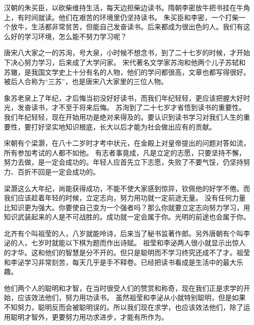 \documentclass[avery5371,grid]{flashcards}
\begin{document}
{汉朝的朱买臣，以砍柴维持生活，每天边担柴边读书。隋朝李密放牛把书挂在牛角上，有时间就读。他们在艰苦的环境里仍坚持读书。} %
{朱买臣和李密，一个打柴一个放牛，生活都非常贫苦，但能自己发奋读书。后来都成为很出色的人。我们有这么好的学习环境，怎么能不努力学习呢？} %

{唐宋八大家之一的苏洵，号大泉，小时候不想念书，到了二十七岁的时候，才开始下决心努力学习，后来成了大学问家。} %
{宋代著名文学家苏洵和他两个儿子苏轼和苏辙，是我国文学史上十分有名的人物，他们的学问都很高，文章也都写得很好。被后人合称为“三苏”，也是唐宋八大家里的三位人物。} %

{象苏老泉上了年纪，才后悔当初没好好读书，而我们年纪轻轻，更应该把握大好时光，发奋读书，才不至于将来后悔。} %
{苏洵到了二十七岁才省悟到读书的重要性。我们年纪轻轻，现在开始用功是绝对来得及的。要认识到读书学习对我们人生的重要性，要打好坚实地知识根底，长大以后才能为社会做出应有的贡献。} %

{宋朝有个梁灏，在八十二岁时才考中状元，在金殿上对皇帝提出的问题对答如流，所有参加考试的人都不如他。} %
{有志者事竟成，凡是立定的志愿，只要坚持不懈，努力去做，是一定会成功的。年轻人应首先立下志愿，失败了不要气馁，仍坚持努力、百折不回是一定会成功的。} %

{梁灏这么大年纪，尚能获得成功，不能不使大家感到惊异，钦佩他的好学不倦。而我们应该趁着年轻的时候，立定志向，努力用功就一定前途无量。} %
{没有任何力量比知识更为强大。你要使自己变为一个强者吗？那么你就要立定志向努力学习，用知识武装起来的人是不可战胜的。成功就一定会属于你。光明的前途也会属于你。} %

{北齐有个叫祖莹的人，八岁就能呤诗，后来当了秘书监著作郎。另外唐朝有个叫李泌的人，七岁时就能以下棋为题而作出诗赋。} %
{祖莹和李泌两人很小就显示出惊人的才华。这和他们的智慧是分不开的。但只是聪明而不学习终究还成不了才。祖莹和李泌学习非常刻苦，每天几乎是手不释卷。已经把读书看成是生活中的最大乐趣。} %

{他们两个人的聪明和才智，在当时很受人们的赞赏和称奇，现在我们正是求学的开始，应该效法他们，努力用功读书。} %
{虽然祖莹和李泌从小就特别聪明，但是如果不知努力，聪明反而会被聪明误的。所以我们现在求学，也应该效法他们，除了运用聪明才智外，更要努力用功求进步，才能有所作为。} %
\end{document}
